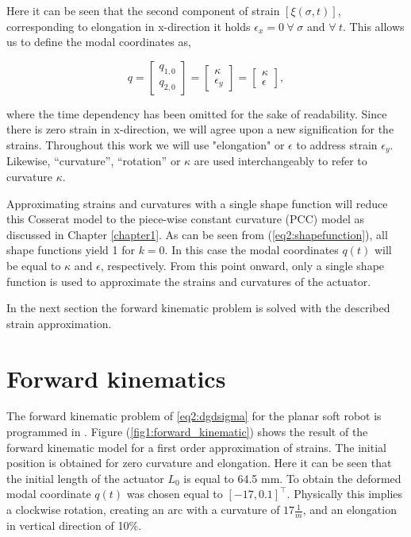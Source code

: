 Here it can be seen that the second component of strain $[\xi(\sigma,t)]$, corresponding to elongation in x-direction it holds $\epsilon_x = 0 \hspace{3pt} \forall \hspace{3pt} \sigma $ and $ \forall \hspace{3pt} t$. This allows us to define the modal coordinates as,


\begin{equation}
    q= \begin{bmatrix} q_{1,0} \\ q_{2,0} \end{bmatrix} = \begin{bmatrix} \kappa \\ \epsilon_y \end{bmatrix} = \begin{bmatrix} \kappa\\ \epsilon \end{bmatrix},
\end{equation}

where the time dependency has been omitted for the sake of readability. Since there is zero strain in x-direction, we will agree upon a new signification for the strains. Throughout this work we will use "elongation" or $\epsilon$ to address strain $\epsilon_y$. Likewise, ``curvature'', ``rotation'' or  $\kappa$ are used interchangeably to refer to curvature $\kappa$. 

Approximating strains and curvatures with a single shape function will reduce this Cosserat model to the piece-wise constant curvature (PCC) model as discussed in Chapter \ref{chapter1}. As can be seen from (\ref{eq2:shapefunction}), all shape functions yield 1 for $k=0$. In this case the modal coordinates $q(t)$ will be equal to $\kappa$ and $\epsilon$, respectively. From this point onward, only a single shape function is used to approximate the strains and curvatures of the actuator. 

In the next section the forward kinematic problem is solved with the described strain approximation.




\section{Forward kinematics}

The forward kinematic problem of \ref{eq2:dgdsigma} for the planar soft robot is programmed in \MATLAB \cite{MATLAB2020}. Figure (\ref{fig1:forward_kinematic}) shows the result of the forward kinematic model for a first order approximation of strains. The initial position is obtained for zero curvature and elongation. Here it can be seen that the initial length of the actuator $L_0$ is equal to 64.5 mm. To obtain the deformed modal coordinate $q(t)$ was chosen equal to $[-17,0.1]^\top$. Physically this implies a clockwise rotation, creating an arc with a curvature of $17 \frac{1}{m}$, and an elongation in vertical direction of 10\%.

